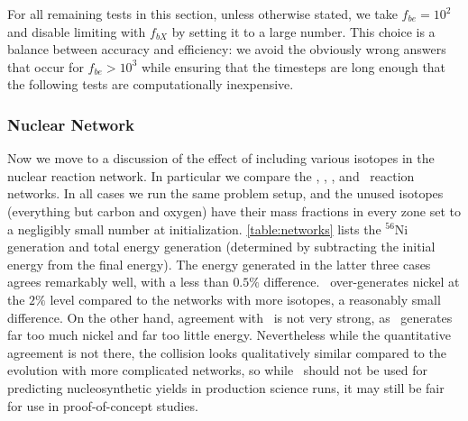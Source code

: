 \documentclass[12pt]{article}
\begin{document}


For all remaining tests in this section, unless otherwise stated, we take $f_{be} = 10^2$
and disable limiting with $f_{bX}$ by setting it to a large number. This choice is a balance
between accuracy and efficiency: we avoid the obviously wrong answers that occur for $f_{be} > 10^3$
while ensuring that the timesteps are long enough that the following tests are computationally
inexpensive.

\subsubsection{Nuclear Network}
\label{sec:collision_parameters:network}

Now we move to a discussion of the effect of including various isotopes
in the nuclear reaction network. In particular we compare the \isoseven, \aproxthirteen,
\aproxnineteen, and \aproxtwentyone\ reaction networks. In all cases we run
the same problem setup, and the unused isotopes (everything but carbon and oxygen)
have their mass fractions in every zone set to a negligibly small number at initialization.
\autoref{table:networks} lists the $^{56}$Ni generation and total energy generation (determined
by subtracting the initial energy from the final energy). The energy generated in the latter
three cases agrees remarkably well, with a less than $0.5\%$ difference. \aproxthirteen\
over-generates nickel at the $2\%$ level compared to the networks with more isotopes, a reasonably
small difference. On the other hand, agreement with \isoseven\ is not very strong, as \isoseven\
generates far too much nickel and far too little energy. Nevertheless while the quantitative
agreement is not there, the collision looks qualitatively similar compared to the evolution with
more complicated networks, so while \isoseven\ should not be used for predicting nucleosynthetic
yields in production science runs, it may still be fair for use in proof-of-concept studies.


\end{document}
